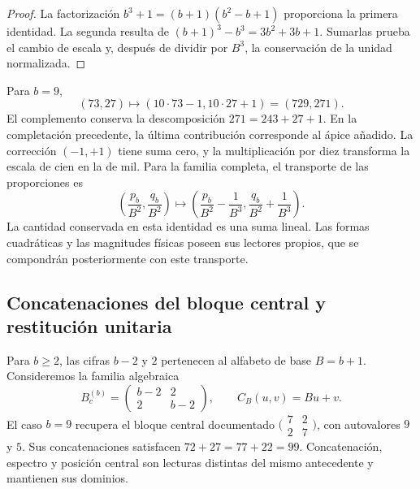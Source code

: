 \begin{proof}
La factorización \(b^3+1=(b+1)(b^2-b+1)\) proporciona la primera
identidad. La segunda resulta de
\((b+1)^3-b^3=3b^2+3b+1\). Sumarlas prueba el cambio de escala y,
después de dividir por \(B^3\), la conservación de la unidad normalizada.
\end{proof}

Para \(b=9\),
\begin{equation}
 (73,27)\longmapsto(10\cdot73-1,10\cdot27+1)=(729,271).
 \label{lib03:caso-729}
\end{equation}
El complemento conserva la descomposición \(271=243+27+1\). En la
completación precedente, la última contribución corresponde al ápice
añadido. La corrección \((-1,+1)\) tiene suma cero, y la multiplicación
por diez transforma la escala de cien en la de mil. Para la familia
completa, el transporte de las proporciones es
\begin{equation}
 \left(\frac{p_b}{B^2},\frac{q_b}{B^2}\right)
 \longmapsto
 \left(\frac{p_b}{B^2}-\frac1{B^3},
       \frac{q_b}{B^2}+\frac1{B^3}\right).
 \label{lib03:fracciones-completacion}
\end{equation}
La cantidad conservada en esta identidad es una suma lineal. Las formas
cuadráticas y las magnitudes físicas poseen sus lectores propios, que se
compondrán posteriormente con este transporte.

\subsection{Concatenaciones del bloque central y restitución unitaria}
\label{lib03:centro}

Para \(b\geq2\), las cifras \(b-2\) y \(2\) pertenecen al alfabeto de
base \(B=b+1\). Consideremos la familia algebraica
\begin{equation}
 B_c^{(b)}=\begin{pmatrix}b-2&2\\2&b-2\end{pmatrix},\qquad
 C_B(u,v)=Bu+v.
 \label{lib03:bloque-central}
\end{equation}
El caso \(b=9\) recupera el bloque central documentado
\(\bigl(\begin{smallmatrix}7&2\\2&7\end{smallmatrix}\bigr)\), con
autovalores \(9\) y \(5\). Sus concatenaciones satisfacen
\(72+27=77+22=99\). Concatenación, espectro y posición central son
lecturas distintas del mismo antecedente y mantienen sus dominios.

